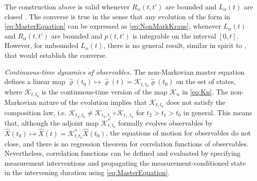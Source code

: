 \documentclass[
    11pt,
    letterpaper,
    reprint,
    notitlepage,
    superscriptaddress,
    aps,prx
]{revtex4-2}
\renewcommand{\rho}{\varrho}
\newcommand{\K}{\mathcal{K}}
\begin{document}
The construction above is valid whenever $R_\alpha(t,t')$ are bounded and $L_\alpha(t)$ 
are closed \cite{Lind76,Dav79,DunfordSchwartz}.
The converse is true in the sense that any evolution of the form in \cref{eq:MasterEquation}
can be expressed as \cref{eq:NonMarkKraus}, whenever $L_\alpha(t)$ and $R_\alpha(t,t')$ are
bounded and $p(t,t')$ is integrable on the interval $[0, t]$.
However, for unbounded $L_\alpha(t)$, there is no general result, similar in spirit 
to \cite{Dav79}, that would establish the converse.



\emph{Continuous-time dynamics of observables.}
The non-Markovian master equation 
 defines a linear map $\hat{\rho}(t_0) \mapsto \hat{\rho}(t) = 
\mathcal{K}_{t,t_0}\hat{\rho}(t_0)$ on the set of states, where $\mathcal{K}_{t,t_0}$ is the
continuous-time version of the map $\K_n$ in \cref{eq:Kn}.
The non-Markovian nature of the evolution implies that $\mathcal{K}_{t,t_0}$ does not satisfy the composition law, i.e.
$\mathcal{K}_{t_2,t_0} \neq \mathcal{K}_{t_2,t_1}\circ \mathcal{K}_{t_1,t_0}$ 
for $t_2 > t_1 > t_0$ in general.
This means that, although the adjoint map $\mathcal{K}_{t,t_0}^*$ formally evolves observables by $\hat{X}(t_0)\mapsto \hat X(t) = \mathcal{K}_{t,t_0}^* \hat X(t_0)$, 
the equations of motion for observables do not close, and there is no regression theorem for correlation functions of observables.
Nevertheless, correlation functions can be defined
and evaluated by specifying measurement interventions and propagating the
measurement-conditioned state in the intervening duration using \cref{eq:MasterEquation}.
\end{document}
